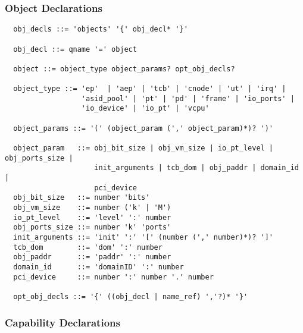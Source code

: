 \documentclass[a4paper,11pt]{article}
\begin{document}
\subsubsection{Object Declarations}

\begin{verbatim}
  obj_decls ::= 'objects' '{' obj_decl* '}'

  obj_decl ::= qname '=' object

  object ::= object_type object_params? opt_obj_decls?

  object_type ::= 'ep'  | 'aep' | 'tcb' | 'cnode' | 'ut' | 'irq' |
                  'asid_pool' | 'pt' | 'pd' | 'frame' | 'io_ports' |
                  'io_device' | 'io_pt' | 'vcpu'

  object_params ::= '(' (object_param (',' object_param)*)? ')'

  object_param   ::= obj_bit_size | obj_vm_size | io_pt_level | obj_ports_size |
                     init_arguments | tcb_dom | obj_paddr | domain_id |
                     pci_device
  obj_bit_size   ::= number 'bits'
  obj_vm_size    ::= number ('k' | 'M')
  io_pt_level    ::= 'level' ':' number
  obj_ports_size ::= number 'k' 'ports'
  init_arguments ::= 'init' ':' '[' (number (',' number)*)? ']'
  tcb_dom        ::= 'dom' ':' number
  obj_paddr      ::= 'paddr' ':' number
  domain_id      ::= 'domainID' ':' number
  pci_device     ::= number ':' number '.' number

  opt_obj_decls ::= '{' ((obj_decl | name_ref) ','?)* '}'
\end{verbatim}


\subsubsection{Capability Declarations}
\end{document}
